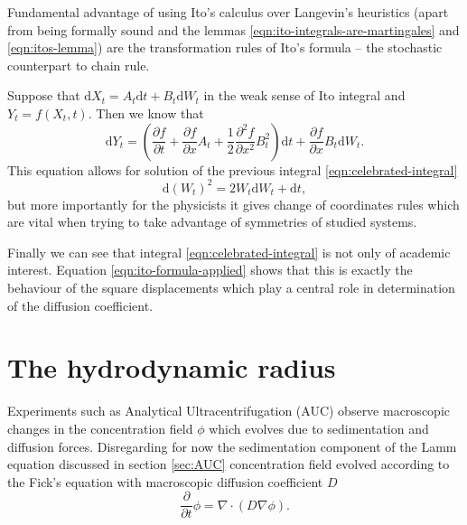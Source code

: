 \documentclass{doctoral}
\newcommand{\pd}{\partial}
\newcommand{\dd}{\mathrm{d}}
\begin{document}
Fundamental advantage of using Ito's calculus over Langevin's heuristics (apart from being formally sound and the lemmas \eqref{eqn:ito-integrals-are-martingales} and \eqref{eqn:itos-lemma}) are the transformation rules of Ito's formula -- the stochastic counterpart to chain rule.

Suppose that $\dd X_t = A_t \dd t + B_t \dd W_t$ in the weak sense of Ito integral and $Y_t = f(X_t,t)$.
Then we know that
\begin{equation}
    \dd Y_t = \left( \frac{\pd f}{\pd t} + \frac{\pd f}{\pd x} A_t + \frac{1}{2} \frac{\pd^2 f}{\pd x^2} B_t^2 \right) \dd t + \frac{\pd f}{\pd x} B_t \dd W_t.
    \label{eqn:itos-formula}
\end{equation}
This equation allows for solution of the previous integral \eqref{eqn:celebrated-integral}
\begin{equation}
    \dd (W_t)^2 = 2 W_t \dd W_t + \dd t, \label{eqn:ito-formula-applied}
\end{equation}
but more importantly for the physicists it gives change of coordinates rules which are vital when trying to take advantage of symmetries of studied systems.

Finally we can see that integral \eqref{eqn:celebrated-integral} is not only of academic interest.
Equation \eqref{eqn:ito-formula-applied} shows that this is exactly the behaviour of the square displacements which play a central role in determination of the diffusion coefficient.


\section{The hydrodynamic radius}

Experiments such as Analytical Ultracentrifugation (AUC) observe macroscopic changes in the concentration field $\phi$ which evolves due to sedimentation and diffusion forces.
Disregarding for now the sedimentation component of the Lamm equation discussed in section \ref{sec:AUC} concentration field evolved according to the Fick's equation with macroscopic diffusion coefficient $D$
\begin{equation}
    \frac{\pd}{\pd t} \phi = \nabla \cdot ( D \nabla \phi ).
    \label{eqn:ficks-law}
\end{equation}
\end{document}
